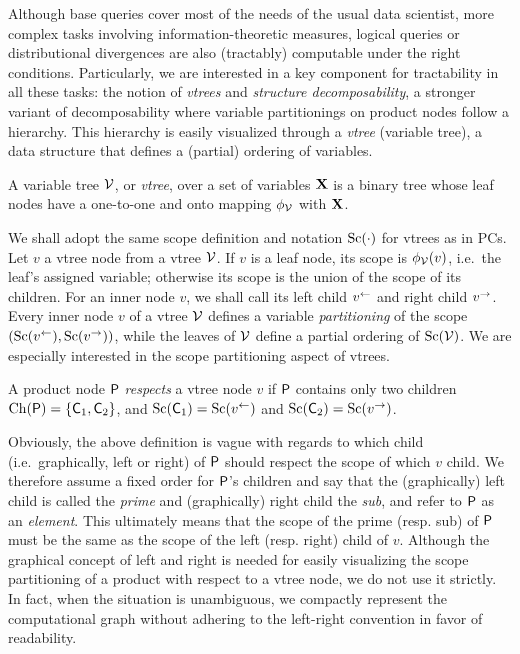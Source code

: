 Although base queries cover most of the needs of the usual data scientist, more complex tasks
involving information-theoretic measures, logical queries or distributional divergences are also
(tractably) computable under the right conditions. Particularly, we are interested in a key
component for tractability in all these tasks: the notion of \emph{vtrees} and \emph{structure
decomposability}, a stronger variant of decomposability where variable partitionings on product
nodes follow a hierarchy. This hierarchy is easily visualized through a \emph{vtree} (variable
tree), a data structure that defines a (partial) ordering of variables.

\begin{definition}[Vtree]
  A variable tree $\operatorname{\mathcal{V}}$, or \emph{vtree}, over a set of variables $\mathbf{X}$ is a binary tree
  whose leaf nodes have a one-to-one and onto mapping $\phi_{\operatorname{\mathcal{V}}}$ with $\mathbf{X}$.
\end{definition}

We shall adopt the same scope definition and notation $\operatorname*{\normalfont{Sc}}(\cdot)$ for vtrees as in PCs. Let $v$ a
vtree node from a vtree $\operatorname{\mathcal{V}}$. If $v$ is a leaf node, its scope is $\phi_{\operatorname{\mathcal{V}}}(v)$, i.e.\ the
leaf's assigned variable; otherwise its scope is the union of the scope of its children. For an
inner node $v$, we shall call its left child $v^\gets$ and right child $v^\to$. Every inner node
$v$ of a vtree $\operatorname{\mathcal{V}}$ defines a variable \emph{partitioning} of the scope $(\operatorname*{\normalfont{Sc}}(v^\gets),
\operatorname*{\normalfont{Sc}}(v^\to))$, while the leaves of $\operatorname{\mathcal{V}}$ define a partial ordering of $\operatorname*{\normalfont{Sc}}(\operatorname{\mathcal{V}})$. We are
especially interested in the scope partitioning aspect of vtrees.

\begin{definition}
  A product node $\operatorname{\textsf{P}}$ \emph{respects} a vtree node $v$ if $\operatorname{\textsf{P}}$ contains only two children
  $\operatorname*{\normalfont{Ch}}(\operatorname{\textsf{P}})=\{\operatorname{\textsf{C}}_1,\operatorname{\textsf{C}}_2\}$, and $\operatorname*{\normalfont{Sc}}(\operatorname{\textsf{C}}_1)=\operatorname*{\normalfont{Sc}}(v^\gets)$ and $\operatorname*{\normalfont{Sc}}(\operatorname{\textsf{C}}_2)=
  \operatorname*{\normalfont{Sc}}(v^\to)$.
\end{definition}

Obviously, the above definition is vague with regards to which child (i.e.\ graphically, left or
right) of $\operatorname{\textsf{P}}$ should respect the scope of which $v$ child. We therefore assume a fixed order
for $\operatorname{\textsf{P}}$'s children and say that the (graphically) left child is called the \emph{prime} and
(graphically) right child the \emph{sub}, and refer to $\operatorname{\textsf{P}}$ as an \emph{element}. This
ultimately means that the scope of the prime (resp.  sub) of $\operatorname{\textsf{P}}$ must be the same as the scope
of the left (resp. right) child of $v$. Although the graphical concept of left and right is needed
for easily visualizing the scope partitioning of a product with respect to a vtree node, we do not
use it strictly. In fact, when the situation is unambiguous, we compactly represent the
computational graph without adhering to the left-right convention in favor of readability.

